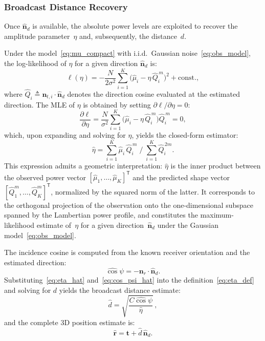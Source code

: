 \documentclass[conference]{IEEEtran}
\begin{document}
\subsubsection{Broadcast Distance Recovery}
\label{subsubsec:distance_recovery}
Once $\hat{\mathbf{n}}_d$ is available, the absolute power levels are exploited to recover the amplitude parameter~$\eta$ and, subsequently, the distance~$d$.

Under the model~\eqref{eq:mu_compact} with i.i.d.\ Gaussian noise~\eqref{eq:obs_model}, the log-likelihood of $\eta$ for a given direction $\hat{\mathbf{n}}_d$ is:
\begin{equation}
\ell(\eta) = -\frac{N}{2\sigma^2}\sum_{i=1}^K \bigl(\hat\mu_i - \eta\,\hat Q_i^{\,m}\bigr)^2 + \mathrm{const.},
\label{eq:loglik_eta}
\end{equation}
where $\hat Q_i\triangleq\mathbf{n}_{t,i}\cdot\hat{\mathbf{n}}_d$ denotes the direction cosine evaluated at the estimated direction.
The MLE of $\eta$ is obtained by setting $\partial\ell/\partial\eta=0$:
\begin{equation}
\frac{\partial\ell}{\partial\eta} = \frac{N}{\sigma^2}\sum_{i=1}^K \bigl(\hat\mu_i - \eta\,\hat Q_i^{\,m}\bigr)\hat Q_i^{\,m} = 0,
\label{eq:dloglik}
\end{equation}
which, upon expanding and solving for $\eta$, yields the closed-form estimator:
\begin{equation}
\hat\eta = \sum_{i=1}^K \hat\mu_i\,\hat Q_i^{\,m}\;\Big/\;\sum_{i=1}^K \hat Q_i^{\,2m}.
\label{eq:eta_hat}
\end{equation}
This expression admits a geometric interpretation: $\hat\eta$ is the inner product between the observed power vector $[\hat\mu_1,\ldots,\hat\mu_K]^{\mathsf T}$ and the predicted shape vector $[\hat Q_1^m,\ldots,\hat Q_K^m]^{\mathsf T}$, normalized by the squared norm of the latter.
It corresponds to the orthogonal projection of the observation onto the one-dimensional subspace spanned by the Lambertian power profile, and constitutes the maximum-likelihood estimate of~$\eta$ for a given direction~$\hat{\mathbf{n}}_d$ under the Gaussian model~\eqref{eq:obs_model}.

The incidence cosine is computed from the known receiver orientation and the estimated direction:
\begin{equation}
\hat\cos\psi = -\mathbf{n}_r\cdot\hat{\mathbf{n}}_d.
\label{eq:cos_psi_hat}
\end{equation}
Substituting~\eqref{eq:eta_hat} and~\eqref{eq:cos_psi_hat} into the definition~\eqref{eq:eta_def} and solving for $d$ yields the broadcast distance estimate:
\begin{equation}
\hat d = \sqrt{\frac{C\hat\cos\psi}{\hat\eta}}\,,
\label{eq:d_hat}
\end{equation}
and the complete 3D position estimate is:
\begin{equation}
\hat{\mathbf{r}} = \mathbf{t} + \hat d\,\hat{\mathbf{n}}_d.
\label{eq:r_hat}
\end{equation}
\end{document}
